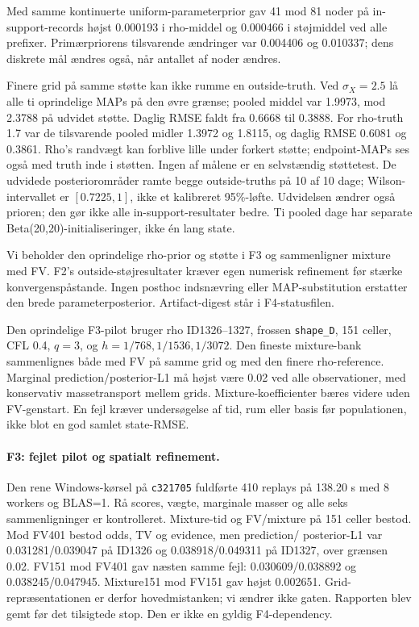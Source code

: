 Med samme kontinuerte uniform-parameterprior gav 41 mod 81 noder på
in-support-records højst 0.000193 i rho-middel og 0.000466 i støjmiddel
ved alle prefixer. Primærpriorens tilsvarende ændringer var 0.004406 og
0.010337; dens diskrete mål ændres også, når antallet af noder ændres.

Finere grid på samme støtte kan ikke rumme en outside-truth.
Ved \(\sigma_X=2.5\) lå alle ti oprindelige MAPs på den øvre grænse;
pooled middel var 1.9973, mod 2.3788 på udvidet støtte. Daglig RMSE
faldt fra 0.6668 til 0.3888. For rho-truth 1.7 var de tilsvarende pooled
midler 1.3972 og 1.8115, og daglig RMSE 0.6081 og 0.3861.
Rho's randvægt kan forblive lille under forkert støtte; endpoint-MAPs ses
også med truth inde i støtten. Ingen af målene er en selvstændig støttetest.
De udvidede posteriorområder ramte begge outside-truths på 10 af 10 dage;
Wilson-intervallet er \([0.7225,1]\), ikke et kalibreret 95\%-løfte.
Udvidelsen ændrer også prioren; den gør ikke alle in-support-resultater bedre.
Ti pooled dage har separate Beta(20,20)-initialiseringer, ikke én lang state.

Vi beholder den oprindelige rho-prior og støtte i F3 og sammenligner
mixture med FV. F2's outside-støjresultater kræver egen numerisk refinement
før stærke konvergenspåstande. Ingen posthoc indsnævring eller MAP-substitution
erstatter den brede parameterposterior. Artifact-digest står i F4-statusfilen.

Den oprindelige F3-pilot bruger rho ID1326--1327, frossen \texttt{shape\_D}, 151 celler,
CFL 0.4, \(q=3\), og \(h=1/768,1/1536,1/3072\). Den fineste mixture-bank
sammenlignes både med FV på samme grid og med den finere rho-reference.
Marginal prediction/posterior-L1 må højst være 0.02 ved alle observationer,
med konservativ massetransport mellem grids. Mixture-koefficienter bæres
videre uden FV-genstart. En fejl kræver undersøgelse af tid, rum eller basis
før populationen, ikke blot en god samlet state-RMSE.

\paragraph{F3: fejlet pilot og spatialt refinement.}
Den rene Windows-kørsel på \texttt{c321705} fuldførte 410 replays på
138.20 s med 8 workers og BLAS=1. Rå scores, vægte, marginale masser og
alle seks sammenligninger er kontrolleret. Mixture-tid og FV/mixture på
151 celler bestod. Mod FV401 bestod odds, TV og evidence, men prediction/
posterior-L1 var 0.031281/0.039047 på ID1326 og 0.038918/0.049311 på ID1327,
over grænsen 0.02. FV151 mod FV401 gav næsten samme fejl:
0.030609/0.038892 og 0.038245/0.047945. Mixture151 mod FV151 gav højst
0.002651. Grid-repræsentationen er derfor hovedmistanken; vi ændrer ikke gaten.
Rapporten blev gemt før det tilsigtede stop. Den er ikke en gyldig F4-dependency.

